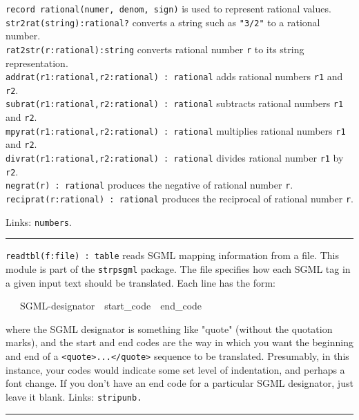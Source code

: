 \texttt{record rational(numer, denom, sign)} is used to represent
rational values.\\
\texttt{str2rat(string):rational?} converts a string such as
\texttt{"3/2"} to a rational
number.\\
\texttt{rat2str(r:rational):string} converts rational number \texttt{r}
to its string representation.\\
\texttt{addrat(r1:rational,r2:rational) : rational} adds rational
numbers \texttt{r1} and \texttt{r2}.\\
\texttt{subrat(r1:rational,r2:rational) : rational} subtracts rational
numbers \texttt{r1} and \texttt{r2}.\\
\texttt{mpyrat(r1:rational,r2:rational) : rational} multiplies rational
numbers \texttt{r1} and \texttt{r2}.\\
\texttt{divrat(r1:rational,r2:rational) : rational} divides rational
number \texttt{r1} by \texttt{r2}.\\
\texttt{negrat(r) : rational} produces the negative of rational number
\texttt{r}.\\
\texttt{reciprat(r:rational) : rational} produces the reciprocal of
rational number \texttt{r}.

Links: \texttt{numbers}. 

\vspace{0.25cm}\hrule{}

\texttt{readtbl(f:file) : table} reads SGML mapping
information from a file. This module is part of the \texttt{strpsgml}
package. The file specifies how each SGML tag in a given input text
should be translated. Each line has the form:

\ \ \ SGML-designator\ \ start\_code\ \ end\_code

where the SGML designator is something like
"quote" (without the quotation marks), and
the start and end codes are the way in which you want the beginning and
end of a
\texttt{{\textless}quote{\textgreater}...{\textless}/quote{\textgreater}}
sequence to be translated. Presumably, in this instance, your codes
would indicate some set level of indentation, and perhaps a font
change. If you don't have an end code for a particular
SGML designator, just leave it blank.
Links: \texttt{stripunb.}

\vspace{0.25cm}\hrule{}

